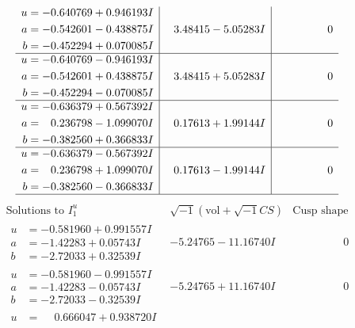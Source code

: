 \documentclass[1p]{elsarticle_modified}
\theoremstyle{definition}
\newcommand{\I}{\sqrt{-1}}
\begin{document}
$$\begin{array}{c|c|c}
\begin{aligned}
u &= -0.640769 + 0.946193 I \\
a &= -0.542601 - 0.438875 I \\
b &= -0.452294 + 0.070085 I\end{aligned}
 & \phantom{-}3.48415 - 5.05283 I & \phantom{-0.000000 } 0 \\ \hline\begin{aligned}
u &= -0.640769 - 0.946193 I \\
a &= -0.542601 + 0.438875 I \\
b &= -0.452294 - 0.070085 I\end{aligned}
 & \phantom{-}3.48415 + 5.05283 I & \phantom{-0.000000 } 0 \\ \hline\begin{aligned}
u &= -0.636379 + 0.567392 I \\
a &= \phantom{-}0.236798 - 1.099070 I \\
b &= -0.382560 + 0.366833 I\end{aligned}
 & \phantom{-}0.17613 + 1.99144 I & \phantom{-0.000000 } 0 \\ \hline\begin{aligned}
u &= -0.636379 - 0.567392 I \\
a &= \phantom{-}0.236798 + 1.099070 I \\
b &= -0.382560 - 0.366833 I\end{aligned}
 & \phantom{-}0.17613 - 1.99144 I & \phantom{-0.000000 } 0\\
 \hline 
 \end{array}$$\newpage$$\begin{array}{c|c|c}  
\text{Solutions to }I^u_{1}& \I (\text{vol} + \sqrt{-1}CS) & \text{Cusp shape}\\
 \hline 
\begin{aligned}
u &= -0.581960 + 0.991557 I \\
a &= -1.42283 + 0.05743 I \\
b &= -2.72033 + 0.32539 I\end{aligned}
 & -5.24765 - 11.16740 I & \phantom{-0.000000 } 0 \\ \hline\begin{aligned}
u &= -0.581960 - 0.991557 I \\
a &= -1.42283 - 0.05743 I \\
b &= -2.72033 - 0.32539 I\end{aligned}
 & -5.24765 + 11.16740 I & \phantom{-0.000000 } 0 \\ \hline\begin{aligned}
u &= \phantom{-}0.666047 + 0.938720 I \\

\end{aligned}
\end{array}$$
\end{document}
